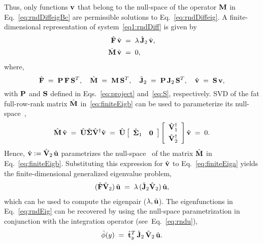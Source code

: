 \documentclass[%
secnumarabic,%
 amssymb, amsmath,%
 aps,prf,superscriptaddress,longbibliography
frontmatterverbose,
]{revtex4-2}
\newcommand{\DefinedAs}[0]{\mathrel{\mathop:}=}
\begin{document}
Thus, only functions $\mathbf{v}$ that belong to the null-space of the operator $\mathbf{M}$ in Eq.~\eqref{eq:rndDiffeigBc} are permissible solutions to Eq.~\eqref{eq:rndDiffeig}. A finite-dimensional representation of system~\eqref{eq1:rndDiff} is given by
\begin{subequations}\label{eq:finiteEig}
\begin{align}
  \hat{\mathbf{F}}\, \hat{\mathbf{v}} \;&=\; \lambda \, \hat{\mathbf{J}}_2 \,\hat{\mathbf{v}},\label{eq:finiteEiga}\\
  \hat{\mathbf{M}} \, \hat{\mathbf{v}} \;&=\; 0,\label{eq:finiteEigb}
\end{align}
\end{subequations}
where,
$$
\hat{\mathbf{F}} \;=\;  \mathbf{P} \,\mathbf{F} \,\mathbf{S}^T, \quad 
\hat{\mathbf{M}} \;=\;  \mathbf{M} \,\mathbf{S}^T, \quad 
\hat{\mathbf{J}}_2 \;=\;  \mathbf{P} \,\mathbf{J}_2 \,\mathbf{S}^T, \quad 
\hat{\mathbf{v}} \;=\; \mathbf{S}\, \mathbf{v},
$$
with $\mathbf{P}$ and $\mathbf{S}$ defined in Eqs.~\eqref{eq:project} and~\eqref{eq:S}, respectively. SVD of the fat full-row-rank matrix $\hat{\mathbf{M}} $ in~\eqref{eq:finiteEigb} can be used to parameterize its null-space~\cite{jovbamSCL06}, 
	\begin{equation}
  \hat{\mathbf{M}}\,\hat{\mathbf{v} }
  \; = \; 
  \hat{\mathbf{U}} \hat{\boldsymbol \Sigma} \hat{\mathbf{V}}^\dagger \hat{\mathbf{v}} 
  \; = \; 
  \hat{\mathbf{U}}  \left[\begin{array}{cc} \hat{\boldsymbol \Sigma}_1 & \mathbf 0 \end{array} \right] \left[\begin{array}{c}\hat{\mathbf{V}}_{1}^\dagger \\[0.3em] \hat{\mathbf{V}}_{2}^\dagger \end{array}\right] \hat{\mathbf{v} }
  \; = \; 
  0.
  \label{eq:Msvd}
\end{equation}
Hence, $\hat{\HH v} \DefinedAs \hat{\HH V}_{2}\, \hat{\HH u}$ parametrizes the null-space~\cite{FourSubspaces} of the matrix $\hat{\mathbf{M}}$ in Eq.~\eqref{eq:finiteEigb}.  
Substituting this expression for $\hat{\mathbf{v}}$ to Eq.~\eqref{eq:finiteEiga} yields the finite-dimensional generalized eigenvalue problem,
\begin{align}
  (\hat{\mathbf{F}} \hat{\mathbf{V}}_{2})\,\hat{\mathbf{u}} \;=\; \lambda \,(\hat{\mathbf{J}}_2 \hat{\mathbf{V}}_{2})\, \hat{\mathbf{u}},
\end{align}
which can be used to compute the eigenpair ($\lambda, \hat{\mathbf{u}}$). The eigenfunctions in Eq.~\eqref{eq:rndEig} can be recovered by using the null-space parametrization in conjunction with the integration operator (see~Eq.~\eqref{eq:rndu}),
	\[
	\hat{\phi} (y)
	\; = \; 
	\hat{\mathbf{t}}_y^T
	\, 
	\hat{\mathbf{J}}_2 
	\, 
	\hat{\mathbf{V}}_{2} 
	\, 
	\hat{\mathbf{u}}. 
	\]
\end{document}
